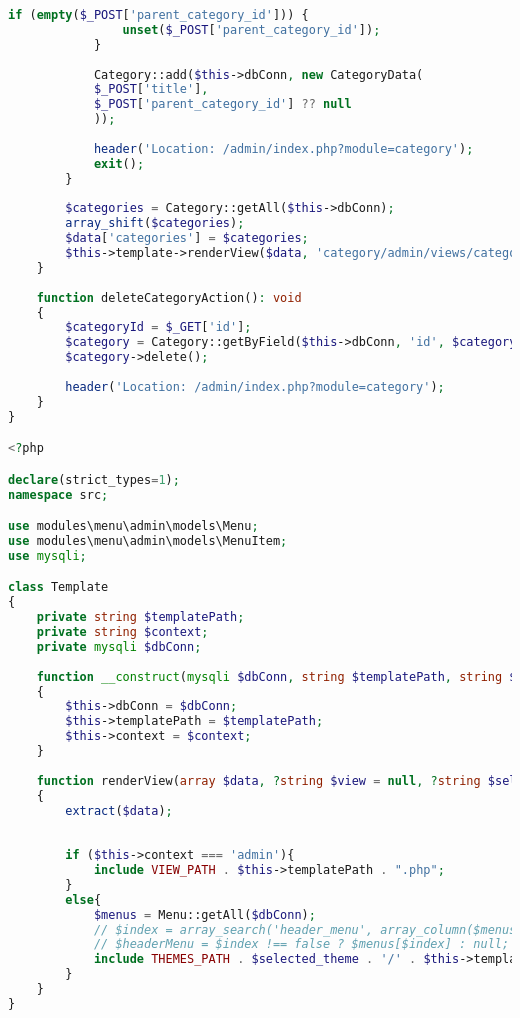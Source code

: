 \begin{lstlisting}[language=PHP, frame=none]
			if (empty($_POST['parent_category_id'])) {
				unset($_POST['parent_category_id']);
			}
			
			Category::add($this->dbConn, new CategoryData(
			$_POST['title'],
			$_POST['parent_category_id'] ?? null
			));
			
			header('Location: /admin/index.php?module=category');
			exit();
		}
		
		$categories = Category::getAll($this->dbConn);
		array_shift($categories);
		$data['categories'] = $categories;
		$this->template->renderView($data, 'category/admin/views/category_add');
	}
	
	function deleteCategoryAction(): void
	{
		$categoryId = $_GET['id'];
		$category = Category::getByField($this->dbConn, 'id', $categoryId);
		$category->delete();
		
		header('Location: /admin/index.php?module=category');
	}
}

<?php

declare(strict_types=1);
namespace src;

use modules\menu\admin\models\Menu;
use modules\menu\admin\models\MenuItem;
use mysqli;

class Template
{
	private string $templatePath;
	private string $context;
	private mysqli $dbConn;
	
	function __construct(mysqli $dbConn, string $templatePath, string $context = 'site')
	{
		$this->dbConn = $dbConn;
		$this->templatePath = $templatePath;
		$this->context = $context;
	}
	
	function renderView(array $data, ?string $view = null, ?string $selected_theme = null) : void
	{
		extract($data);
		
		
		if ($this->context === 'admin'){
			include VIEW_PATH . $this->templatePath . ".php";
		}
		else{
			$menus = Menu::getAll($dbConn);
			// $index = array_search('header_menu', array_column($menus, 'name'));
			// $headerMenu = $index !== false ? $menus[$index] : null;
			include THEMES_PATH . $selected_theme . '/' . $this->templatePath . ".php";
		}
	}
}

	
\end{lstlisting}

\fi
